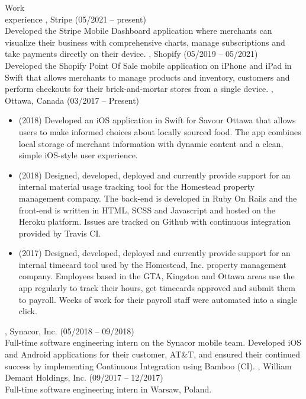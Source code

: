 \documentclass{resume}
\begin{document}
\begin{category}{Work \\experience}
, Stripe (05/2021 -- present)\\
Developed the Stripe Mobile Dashboard application where merchants can visualize their business
with comprehensive charts, manage subscriptions and take payments
directly on their device.
, Shopify (05/2019 -- 05/2021)\\
Developed the Shopify Point Of Sale mobile application on iPhone and iPad in Swift that
allows merchants to manage products and inventory, customers and perform checkouts for
their brick-and-mortar stores from a single device.
, Ottawa, Canada (03/2017 -- Present)
\begin{itemize}
  \item (2018) Developed an iOS application in Swift for Savour Ottawa that allows
    users to make informed choices about locally sourced food. The app combines
    local storage of merchant information with dynamic content and a clean,
    simple iOS-style user experience.
  \item (2018) Designed, developed, deployed and currently provide support for an
    internal material usage tracking tool for the Homestead property management
    company. The back-end is developed in Ruby On Rails and the front-end is written
    in HTML, SCSS and Javascript and hosted on the Heroku platform. Issues are tracked
    on Github with continuous integration provided by Travis CI.
  \item (2017) Designed, developed, deployed and currently provide support for an
    internal timecard tool used by the Homestead, Inc. property management company.
    Employees based in the GTA, Kingston and Ottawa areas use the app regularly to
    track their hours, get timecards approved and submit them to payroll.
    Weeks of work for their payroll staff were automated into a single click.
  \end{itemize}
, Synacor, Inc. (05/2018 -- 09/2018)\\
Full-time software engineering intern on the Synacor mobile team.
Developed iOS and Android applications for their customer, AT\&T, and ensured
their continued success by implementing Continuous Integration using Bamboo (CI).
, William Demant Holdings, Inc. (09/2017 -- 12/2017)\\
Full-time software engineering intern in Warsaw, Poland.

\end{category}
\end{document}

